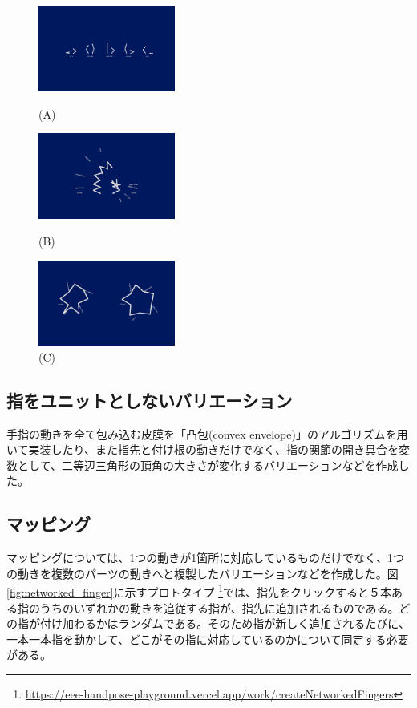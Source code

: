 \begin{figure}[htbp]
  \begin{minipage}[b]{0.33\linewidth}
    \centering
    \includegraphics[keepaspectratio, width=4.5cm]{img/kunoji-pararell.png}
    \caption{(A)}
    \label{fig:kunoji_a}
  \end{minipage}
  \begin{minipage}[b]{0.33\linewidth}
    \centering
    \includegraphics[keepaspectratio, width=4.5cm]{img/kunoji-direct.png}
    \caption{(B)}
    \label{fig:kunoji_b}
  \end{minipage}
  \begin{minipage}[b]{0.33\linewidth}
    \centering
    \includegraphics[keepaspectratio, width=4.5cm]{img/kunoji-circle.png}
    \caption{(C)}
    \label{fig:kunoji_c}
  \end{minipage}
\end{figure}

\subsection*{指をユニットとしないバリエーション}
手指の動きを全て包み込む皮膜を「凸包(convex envelope)」のアルゴリズムを用いて実装したり、また指先と付け根の動きだけでなく、指の関節の開き具合を変数として、二等辺三角形の頂角の大きさが変化するバリエーションなどを作成した。

\subsection{マッピング}
マッピングについては、1つの動きが1箇所に対応しているものだけでなく、1つの動きを複数のパーツの動きへと複製したバリエーションなどを作成した。図\ref{fig:networked_finger}に示すプロトタイプ \footnote{\url{https://eee-handpose-playground.vercel.app/work/createNetworkedFingers}}では、指先をクリックすると５本ある指のうちのいずれかの動きを追従する指が、指先に追加されるものである。どの指が付け加わるかはランダムである。そのため指が新しく追加されるたびに、一本一本指を動かして、どこがその指に対応しているのかについて同定する必要がある。

